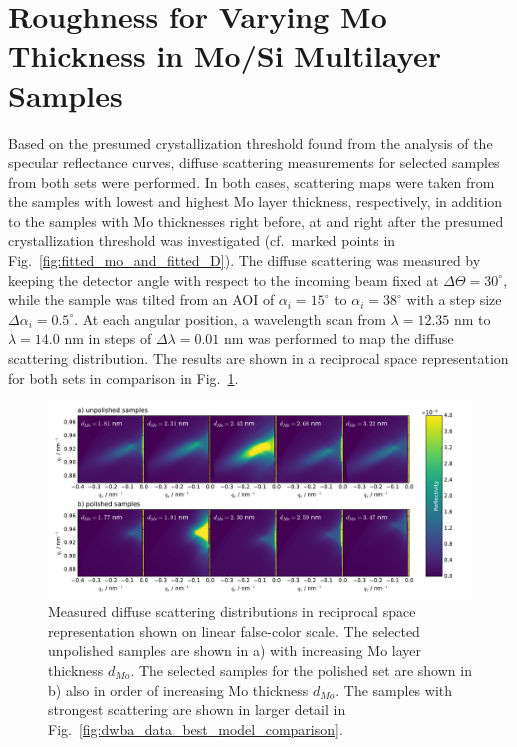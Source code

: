 \section{Roughness for Varying Mo Thickness in Mo/Si Multilayer Samples}

Based on the presumed crystallization threshold found from the analysis of the specular reflectance curves, diffuse scattering measurements for selected samples from both sets were performed. In both cases, scattering maps were taken from the samples with lowest and highest Mo layer thickness, respectively, in addition to the samples with Mo thicknesses right before, at and right after the presumed crystallization threshold was investigated (cf.~marked points in Fig.~\ref{fig:fitted_mo_and_fitted_D}). The diffuse scattering was measured by keeping the detector angle with respect to the incoming beam fixed at $\Delta\Theta = 30^\circ$, while the sample was tilted from an AOI of $\alpha_i=15^\circ$ to $\alpha_i=38^\circ$ with a step size $\Delta\alpha_i = 0.5^\circ$. At each angular position, a wavelength scan from $\lambda=12.35$ nm to $\lambda=14.0$ nm in steps of $\Delta\lambda = 0.01$ nm was performed to map the diffuse scattering distribution. The results are shown in a reciprocal space representation for both sets in comparison in Fig.~\ref{fig:diffuse}.
\begin{figure}[htbp]
\centering
\includegraphics[width=\textwidth]{images/diffuse}
\caption{Measured diffuse scattering distributions in reciprocal space representation shown on linear false-color scale. The selected unpolished samples are shown in a) with increasing Mo layer thickness $d_{Mo}$. The selected samples for the polished set are shown in b) also in order of increasing Mo thickness $d_{Mo}$. The samples with strongest scattering are shown in larger detail in Fig.~\ref{fig:dwba_data_best_model_comparison}.}
\label{fig:diffuse}
\end{figure}

